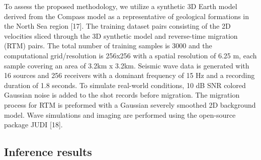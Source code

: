 \documentclass[
]{article}
\begin{document}
To assess the proposed methodology, we utilize a synthetic 3D Earth
model derived from the Compass model as a representative of geological
formations in the North Sea region {[}17{]}. The training dataset pairs
consisting of the 2D velocities sliced through the 3D synthetic model
and reverse-time migration (RTM) pairs. The total number of training
samples is 3000 and the computational grid/resolution is 256x256 with a
spatial resolution of 6.25 m, each sample covering an area of 3.2km x
3.2km. Seismic wave data is generated with 16 sources and 256 receivers
with a dominant frequency of 15 Hz and a recording duration of 1.8
seconds. To simulate real-world conditions, 10 dB SNR colored Gaussian
noise is added to the shot records before migration. The migration
process for RTM is preformed with a Gaussian severely smoothed 2D
background model. Wave simulations and imaging are performed using the
open-source package JUDI {[}18{]}.

\subsection{Inference results}\label{inference-results}
\end{document}

